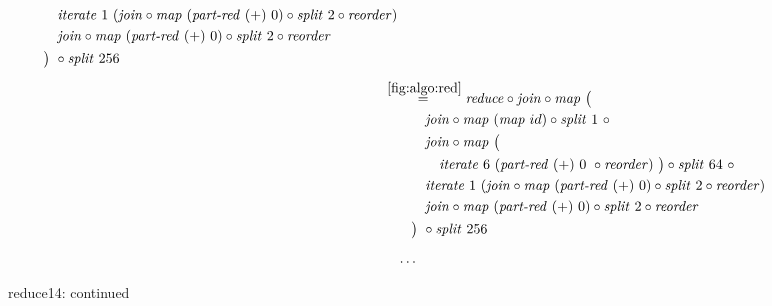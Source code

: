 \begin{figure*}[t]
\begin{align*}
\begin{aligned}
    &\qquad\quad\iterateN\ 1\ (\join \circ \map\ (\partRed\ (+)\ 0) \circ \splitN\ 2\circ \reorder)\\
    &\qquad\quad\join \circ \map\ (\partRed\ (+)\ 0) \circ \splitN\ 2\circ \reorder\\
    &\qquad\big)\ \circ \splitN\ 256
  \end{aligned}\\[.5em]
%
  &\hspace{-2em}\quad\begin{aligned}
    &\overset{\ref{fig:algo:red}}{=\hspace{.2em}}
      \reduce \circ \join \circ \map\ \big(\\
    &\qquad\quad\join \circ \map\ (\map\ id) \circ \splitN\ 1\ \circ\\
    &\qquad\quad\join \circ \map\ \big(\\
    &\qquad\qquad \iterateN\ 6\ (\partRed\ (+)\ 0\ \circ \reorder)\ \big)\circ \splitN\ 64\ \circ\\
    &\qquad\quad\iterateN\ 1\ (\join \circ \map\ (\partRed\ (+)\ 0) \circ \splitN\ 2\circ \reorder)\\
    &\qquad\quad\join \circ \map\ (\partRed\ (+)\ 0) \circ \splitN\ 2\circ \reorder\\
    &\qquad\big)\ \circ \splitN\ 256
  \end{aligned}\\[.5em]
%
  &\ldots
\end{align*}
\caption{reduce14: continued}
\end{figure*}

